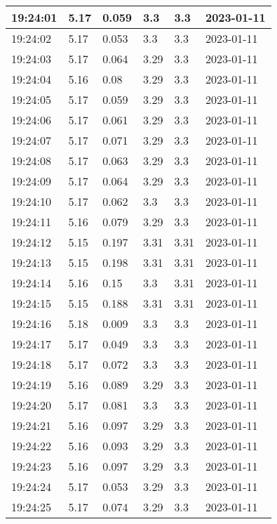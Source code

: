 \begin{longtable}{|l|l|l|l|l|l|}
        19:24:01 & 5.17 & 0.059 & 3.3 & 3.3 & 2023-01-11 \\ \hline
        19:24:02 & 5.17 & 0.053 & 3.3 & 3.3 & 2023-01-11 \\ \hline
        19:24:03 & 5.17 & 0.064 & 3.29 & 3.3 & 2023-01-11 \\ \hline
        19:24:04 & 5.16 & 0.08 & 3.29 & 3.3 & 2023-01-11 \\ \hline
        19:24:05 & 5.17 & 0.059 & 3.29 & 3.3 & 2023-01-11 \\ \hline
        19:24:06 & 5.17 & 0.061 & 3.29 & 3.3 & 2023-01-11 \\ \hline
        19:24:07 & 5.17 & 0.071 & 3.29 & 3.3 & 2023-01-11 \\ \hline
        19:24:08 & 5.17 & 0.063 & 3.29 & 3.3 & 2023-01-11 \\ \hline
        19:24:09 & 5.17 & 0.064 & 3.29 & 3.3 & 2023-01-11 \\ \hline
        19:24:10 & 5.17 & 0.062 & 3.3 & 3.3 & 2023-01-11 \\ \hline
        19:24:11 & 5.16 & 0.079 & 3.29 & 3.3 & 2023-01-11 \\ \hline
        19:24:12 & 5.15 & 0.197 & 3.31 & 3.31 & 2023-01-11 \\ \hline
        19:24:13 & 5.15 & 0.198 & 3.31 & 3.31 & 2023-01-11 \\ \hline
        19:24:14 & 5.16 & 0.15 & 3.3 & 3.31 & 2023-01-11 \\ \hline
        19:24:15 & 5.15 & 0.188 & 3.31 & 3.31 & 2023-01-11 \\ \hline
        19:24:16 & 5.18 & 0.009 & 3.3 & 3.3 & 2023-01-11 \\ \hline
        19:24:17 & 5.17 & 0.049 & 3.3 & 3.3 & 2023-01-11 \\ \hline
        19:24:18 & 5.17 & 0.072 & 3.3 & 3.3 & 2023-01-11 \\ \hline
        19:24:19 & 5.16 & 0.089 & 3.29 & 3.3 & 2023-01-11 \\ \hline
        19:24:20 & 5.17 & 0.081 & 3.3 & 3.3 & 2023-01-11 \\ \hline
        19:24:21 & 5.16 & 0.097 & 3.29 & 3.3 & 2023-01-11 \\ \hline
        19:24:22 & 5.16 & 0.093 & 3.29 & 3.3 & 2023-01-11 \\ \hline
        19:24:23 & 5.16 & 0.097 & 3.29 & 3.3 & 2023-01-11 \\ \hline
        19:24:24 & 5.17 & 0.053 & 3.29 & 3.3 & 2023-01-11 \\ \hline
        19:24:25 & 5.17 & 0.074 & 3.29 & 3.3 & 2023-01-11 \\ \hline

\end{longtable}
